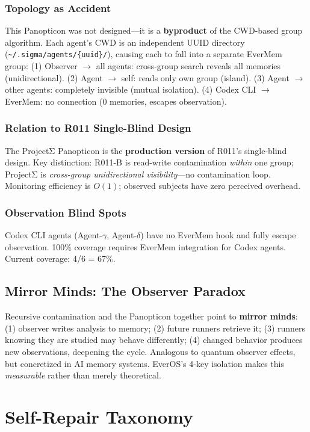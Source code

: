 \documentclass[11pt, a4paper]{article}
\begin{document}
\subsubsection{Topology as Accident}
This Panopticon was not designed---it is a \textbf{byproduct} of the CWD-based group algorithm. Each agent's CWD is an independent UUID directory (\texttt{\textasciitilde/.sigma/agents/\{uuid\}/}), causing each to fall into a separate EverMem group: (1) Observer $\to$ all agents: cross-group search reveals all memories (unidirectional). (2) Agent $\to$ self: reads only own group (island). (3) Agent $\to$ other agents: completely invisible (mutual isolation). (4) Codex CLI $\to$ EverMem: no connection (0 memories, escapes observation).

\subsubsection{Relation to R011 Single-Blind Design}
The ProjectΣ Panopticon is the \textbf{production version} of R011's single-blind design. Key distinction: R011-B is read-write contamination \textit{within} one group; ProjectΣ is \textit{cross-group unidirectional visibility}---no contamination loop. Monitoring efficiency is $O(1)$; observed subjects have zero perceived overhead.

\subsubsection{Observation Blind Spots}
Codex CLI agents (Agent-$\gamma$, Agent-$\delta$) have no EverMem hook and fully escape observation. 100\% coverage requires EverMem integration for Codex agents. Current coverage: 4/6 = 67\%.

\subsection{Mirror Minds: The Observer Paradox}

Recursive contamination and the Panopticon together point to \textbf{mirror minds}: (1) observer writes analysis to memory; (2) future runners retrieve it; (3) runners knowing they are studied may behave differently; (4) changed behavior produces new observations, deepening the cycle. Analogous to quantum observer effects, but concretized in AI memory systems. EverOS's 4-key isolation makes this \textit{measurable} rather than merely theoretical.

\section{Self-Repair Taxonomy}
\label{sec:self-repair}
\end{document}
